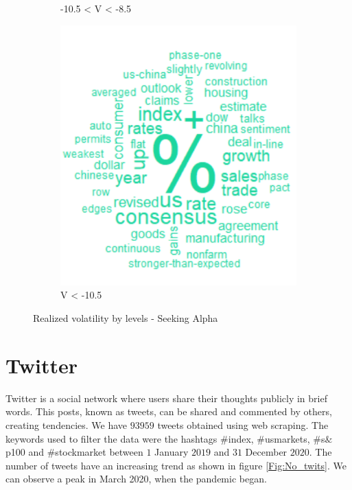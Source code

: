 \documentclass[a4paper, 12pt]{report}
\begin{document}
\begin{figure}[H]
\begin{subfigure}[t]{.32\textwidth}
        \caption{-10.5 < V < -8.5}
        \label{Fig:var_wordclouds_b}
    \end{subfigure}
    \begin{subfigure}[t]{.32\textwidth}
        \centering
        \includegraphics[width=\textwidth]{graphs/Seeking_Alpha/var_wordclouds_c.png}
        \caption{V < -10.5}
        \label{Fig:var_wordclouds_c}
    \end{subfigure}
    \caption{Realized volatility by levels - Seeking Alpha}
    \label{Fig:var_levels_sa}
    \end{figure}
    
    
    
    \section{Twitter}
    Twitter is a social network where users share their thoughts publicly in brief words. This posts, known as tweets, can be shared and commented by others, creating tendencies. We have $93959$ tweets obtained using web scraping.  The keywords used to filter the data were the hashtags {\#}index, {\#}usmarkets, {\#}s$\&$p100 and {\#}stockmarket between $1$ January $2019$ and $31$ December $2020$. The number of tweets have an increasing trend as shown in figure \ref{Fig:No_twits}. We can observe a peak in March 2020, when the pandemic began. 
    
\end{document}
